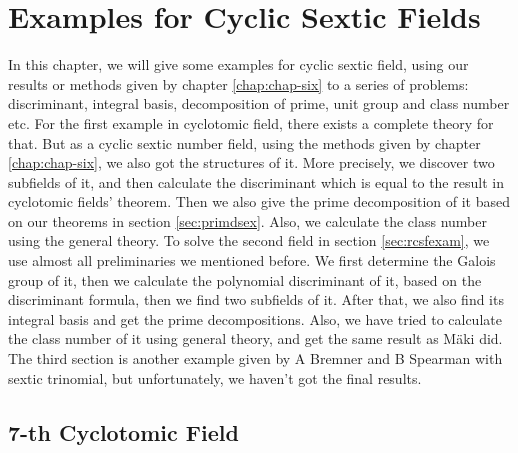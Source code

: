\chapter{Examples for Cyclic Sextic Fields}
\label{chap:chap-seven}
In this chapter, we will give some examples for cyclic sextic field, using our results or methods given by chapter \ref{chap:chap-six} to a series of  problems: discriminant, integral basis, decomposition of prime, unit group and class number etc. For the first example in cyclotomic field, there exists a complete theory for that. But as a cyclic sextic number field, using the methods given by chapter \ref{chap:chap-six}, we also got the structures of it. More precisely, we discover two subfields of it, and then calculate the discriminant which is equal to the result in cyclotomic fields' theorem. Then we also give the prime decomposition of it based on our theorems in section \ref{sec:primdsex}. Also, we calculate the class number using the general theory. To solve the second field in section \ref{sec:rcsfexam}, we use almost all preliminaries we mentioned before. We first determine the Galois group of it, then we calculate the polynomial discriminant of it, based on the discriminant formula, then we find two subfields of it. After that, we also find its integral basis and get the prime decompositions. Also, we have tried to calculate the class number of it using general theory, and get the same result as M\"{a}ki did. The third section is another example given by A Bremner and B Spearman\citep{bremner2010cyclic} with sextic trinomial, but unfortunately, we haven't got the final results.

\section{7-th Cyclotomic Field}
